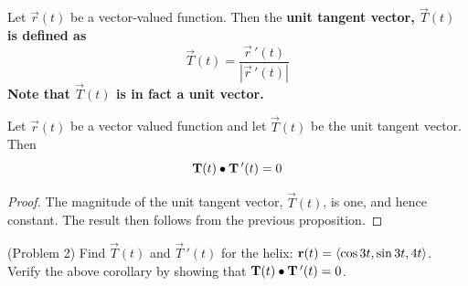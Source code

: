 \documentclass[handout]{ximera}
\begin{document}
\begin{definition}
Let $\vec r(t)$ be a vector-valued function. Then the \bf{unit tangent vector}, $\vec T(t)$ is defined as
\[
\vec T(t) = \frac{\vec r\,'(t)}{|\vec r\,'(t)|}
\]
Note that $\vec T(t)$ is in fact a unit vector.
\end{definition}

\begin{corollary}
Let $\vec r(t)$ be a vector valued function and let $\vec T(t)$ be the unit tangent vector.
Then 
\[
\mathbf T(t) \bullet \mathbf T\,'(t) = 0
\]
\end{corollary}
\begin{proof}
The magnitude of the unit tangent vector, $\vec T(t)$, is one, and hence constant. The result then follows from the previous proposition.
\end{proof}

\begin{problem}(Problem 2)
Find $\vec T(t)$ and $\vec T\,'(t)$ for the helix: $\displaystyle \mathbf r(t) = \left\langle \cos 3t, \sin 3t, 4t\right\rangle$.\\
Verify the above corollary by showing that $\mathbf T(t) \bullet \mathbf T\,'(t) = 0$.
\end{problem}
\end{document}
